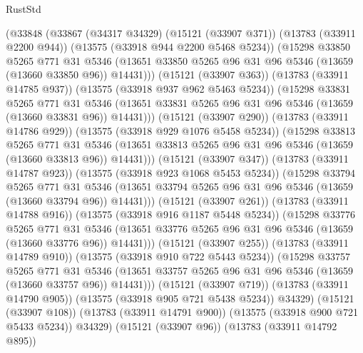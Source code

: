 \begin{lexlean}{RustStd}
\begin{coremodule}
                (@33848
                  (@33867
                    (@34317 @34329)
                    (@15121 (@33907 @371))
                    (@13783 (@33911 @2200 @944))
                    (@13575 (@33918 @944 @2200 @5468 @5234))
                    (@15298
                      @33850
                      @5265
                      @771
                      @31
                      @5346
                      (@13651 @33850 @5265 @96 @31 @96 @5346 (@13659 (@13660 @33850 @96)) @14431)))
                  (@15121 (@33907 @363))
                  (@13783 (@33911 @14785 @937))
                  (@13575 (@33918 @937 @962 @5463 @5234))
                  (@15298
                    @33831
                    @5265
                    @771
                    @31
                    @5346
                    (@13651 @33831 @5265 @96 @31 @96 @5346 (@13659 (@13660 @33831 @96)) @14431)))
                (@15121 (@33907 @290))
                (@13783 (@33911 @14786 @929))
                (@13575 (@33918 @929 @1076 @5458 @5234))
                (@15298
                  @33813
                  @5265
                  @771
                  @31
                  @5346
                  (@13651 @33813 @5265 @96 @31 @96 @5346 (@13659 (@13660 @33813 @96)) @14431)))
              (@15121 (@33907 @347))
              (@13783 (@33911 @14787 @923))
              (@13575 (@33918 @923 @1068 @5453 @5234))
              (@15298
                @33794
                @5265
                @771
                @31
                @5346
                (@13651 @33794 @5265 @96 @31 @96 @5346 (@13659 (@13660 @33794 @96)) @14431)))
            (@15121 (@33907 @261))
            (@13783 (@33911 @14788 @916))
            (@13575 (@33918 @916 @1187 @5448 @5234))
            (@15298
              @33776
              @5265
              @771
              @31
              @5346
              (@13651 @33776 @5265 @96 @31 @96 @5346 (@13659 (@13660 @33776 @96)) @14431)))
          (@15121 (@33907 @255))
          (@13783 (@33911 @14789 @910))
          (@13575 (@33918 @910 @722 @5443 @5234))
          (@15298
            @33757
            @5265
            @771
            @31
            @5346
            (@13651 @33757 @5265 @96 @31 @96 @5346 (@13659 (@13660 @33757 @96)) @14431)))
        (@15121 (@33907 @719))
        (@13783 (@33911 @14790 @905))
        (@13575 (@33918 @905 @721 @5438 @5234))
        @34329)
      (@15121 (@33907 @108))
      (@13783 (@33911 @14791 @900))
      (@13575 (@33918 @900 @721 @5433 @5234))
      @34329)
    (@15121 (@33907 @96))
    (@13783 (@33911 @14792 @895))

\end{coremodule}
\end{lexlean}
